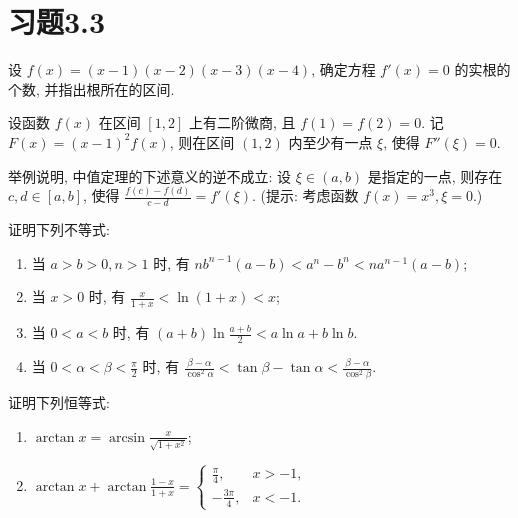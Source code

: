 \section{习题3.3}

\begin{exercise}[3.3.1]
    设 $f(x)=(x-1)(x-2)(x-3)(x-4)$, 确定方程 $f'(x)=0$ 的实根的个数, 并指出根所在的区间.
\end{exercise}

\begin{exercise}[3.3.2]
    设函数 $f(x)$ 在区间 $[1,2]$ 上有二阶微商, 且 $f(1)=f(2)=0$. 记 $F(x)=(x-1)^2 f(x)$, 则在区间 $(1,2)$ 内至少有一点 $\xi$, 使得 $F''(\xi)=0$.
\end{exercise}

\begin{exercise}[3.3.3]
    举例说明, 中值定理的下述意义的逆不成立: 设 $\xi \in (a,b)$ 是指定的一点, 则存在 $c,d \in [a,b]$, 使得 $\frac{f(c)-f(d)}{c-d}=f'(\xi)$. (提示: 考虑函数 $f(x)=x^3, \xi=0$.)
\end{exercise}

\begin{exercise}[3.3.4]
    证明下列不等式:
    \begin{enumerate}
        \item 当 $a>b>0, n>1$ 时, 有 $nb^{n-1}(a-b) < a^n-b^n < na^{n-1}(a-b)$;
        \item 当 $x>0$ 时, 有 $\frac{x}{1+x} < \ln(1+x) < x$;
        \item 当 $0<a<b$ 时, 有 $(a+b)\ln\frac{a+b}{2} < a\ln a + b\ln b$.
        \item 当 $0<\alpha<\beta<\frac{\pi}{2}$ 时, 有 $\frac{\beta-\alpha}{\cos^2\alpha} < \tan\beta - \tan\alpha < \frac{\beta-\alpha}{\cos^2\beta}$.
    \end{enumerate}
\end{exercise}

\begin{exercise}[3.3.5]
    证明下列恒等式:
    \begin{enumerate}
        \item $\arctan x = \arcsin\frac{x}{\sqrt{1+x^2}}$;
        \item $\arctan x + \arctan\frac{1-x}{1+x} = \begin{cases} \frac{\pi}{4}, & x > -1, \\ -\frac{3\pi}{4}, & x < -1. \end{cases}$
    \end{enumerate}
\end{exercise}

